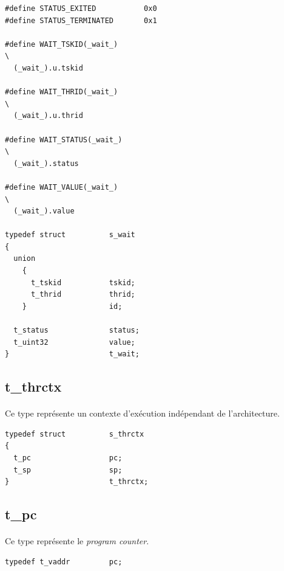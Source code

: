 \documentclass[10pt,a4wide]{article}
\begin{document}
\begin{verbatim}
#define STATUS_EXITED           0x0
#define STATUS_TERMINATED       0x1

#define WAIT_TSKID(_wait_)                                              \
  (_wait_).u.tskid

#define WAIT_THRID(_wait_)                                              \
  (_wait_).u.thrid

#define WAIT_STATUS(_wait_)                                             \
  (_wait_).status

#define WAIT_VALUE(_wait_)                                              \
  (_wait_).value

typedef struct          s_wait
{
  union
    {
      t_tskid           tskid;
      t_thrid           thrid;
    }                   id;

  t_status              status;
  t_uint32              value;
}                       t_wait;
\end{verbatim}

\subsection{t\_thrctx}

\paragraph{}

Ce type repr\'esente un contexte d'ex\'ecution ind\'ependant de
l'architecture.

\begin{verbatim}
typedef struct          s_thrctx
{
  t_pc                  pc;
  t_sp                  sp;
}                       t_thrctx;
\end{verbatim}

\subsection{t\_pc}

\paragraph{}

Ce type repr\'esente le \textit{program counter}.

\begin{verbatim}
typedef t_vaddr         pc;
\end{verbatim}
\end{document}
